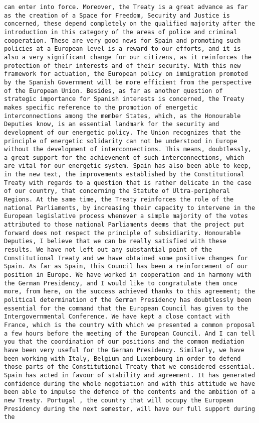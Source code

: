 \documentclass[
]{article}
\begin{document}
\begin{verbatim}
can enter into force. Moreover, the Treaty is a great advance as far as the creation of a Space for Freedom, Security and Justice is concerned, these depend completely on the qualified majority after the introduction in this category of the areas of police and criminal cooperation. These are very good news for Spain and promoting such policies at a European level is a reward to our efforts, and it is also a very significant change for our citizens, as it reinforces the protection of their interests and of their security. With this new framework for actuation, the European policy on immigration promoted by the Spanish Government will be more efficient from the perspective of the European Union. Besides, as far as another question of strategic importance for Spanish interests is concerned, the Treaty makes specific reference to the promotion of energetic interconnections among the member States, which, as the Honourable Deputies know, is an essential landmark for the security and development of our energetic policy. The Union recognizes that the principle of energetic solidarity can not be understood in Europe without the development of interconnections. This means, doubtlessly, a great support for the achievement of such interconnections, which are vital for our energetic system. Spain has also been able to keep, in the new text, the improvements established by the Constitutional Treaty with regards to a question that is rather delicate in the case of our country, that concerning the Statute of Ultra-peripheral Regions. At the same time, the Treaty reinforces the role of the national Parliaments, by increasing their capacity to intervene in the European legislative process whenever a simple majority of the votes attributed to those national Parliaments deems that the project put forward does not respect the principle of subsidiarity. Honourable Deputies, I believe that we can be really satisfied with these results. We have not left out any substantial point of the Constitutional Treaty and we have obtained some positive changes for Spain. As far as Spain, this Council has been a reinforcement of our position in Europe. We have worked in cooperation and in harmony with the German Presidency, and I would like to congratulate them once more, from here, on the success achieved thanks to this agreement; the political determination of the German Presidency has doubtlessly been essential for the command that the European Council has given to the Intergovernmental Conference. We have kept a close contact with France, which is the country with which we presented a common proposal a few hours before the meeting of the European Council. And I can tell you that the coordination of our positions and the common mediation have been very useful for the German Presidency. Similarly, we have been working with Italy, Belgium and Luxembourg in order to defend those parts of the Constitutional Treaty that we considered essential. Spain has acted in favour of stability and agreement. It has generated confidence during the whole negotiation and with this attitude we have been able to impulse the defence of the contents and the ambition of a new Treaty. Portugal , the country that will occupy the European Presidency during the next semester, will have our full support during the 
\end{verbatim}
\end{document}
